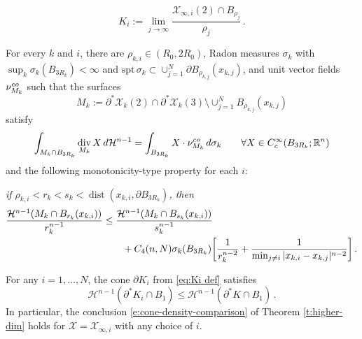 \documentclass[10pt,a4paper]{amsart}
\DeclareMathOperator{\Div}{div}
\DeclareMathOperator{\dist}{dist}
\newcommand{\Hcal}{\mathcal{H}}
\newcommand{\X}{\mathcal{X}}
\newcommand{\spt}{\mathrm{spt}}
\begin{document}
\begin{equation}\label{eq:Ki def}
    K_i := \lim_{j \to \infty} \frac{\X_{\infty,i}(2)\cap B_{\rho_j}}{\rho_j}\,.
\end{equation}

\begin{lemma}\label{l:monotonicity-concentrations}
    For every $k$ and $i$, there are $\rho_{k,i}\in (R_0,2R_0)$, Radon measures $\sigma_{k}$ with $\sup_k \sigma_k(B_{3R_k})<\infty$ and $\spt\, \sigma_{k}\subset \cup_{j=1}^N\partial B_{\rho_{k,j}}(x_{k,j})$, and unit vector fields $\nu_{M_k}^{\rm co}$ such that the surfaces
$$
M_k := \partial^*\X_k(2) \cap \partial^* \X_k(3) \setminus \cup_{j=1}^N B_{\rho_{k,j}}(x_{k,j})
$$
satisfy
\begin{align*}
   \int_{M_k \cap B_{3R_k}}\Div_{M_k}X \,d\mathcal{H}^{n-1} = \int_{B_{3R_k}} X \cdot \nu_{M_k}^{\rm co}\,d\sigma_k \qquad \forall X \in C_c^\infty(B_{3R_k};\mathbb{R}^n) 
\end{align*}
and the following monotonicity-type property for each $i$:
\smallskip

{\it if $\rho_{k,i}<r_k<s_k<\dist(x_{k,i},\partial B_{3R_k})$, then}
\begin{align}\label{eq:large scale area bounds}
    \frac{\mathcal{H}^{n-1}(M_k \cap B_{r_k}(x_{k,i}))}{r_k^{n-1}} &\leq \frac{\mathcal{H}^{n-1}(M_k \cap B_{s_k}(x_{k,i}))}{s_k^{n-1}} \\ \notag
    &\qquad + C_4(n,N)\sigma_k(B_{3R_k})\bigg[\frac{1}{r_k^{n-2}} + \frac{1}{\min_{j\neq i}|x_{k,i}-x_{k,j}|^{n-2}}\bigg]\,.
\end{align}
\end{lemma}

\begin{corollary}\label{c:blowdown-density-bound}
    For any $i=1,\dots, N$, the cone $\partial K_i$ from \eqref{eq:Ki def} satisfies
    \[
        \Hcal^{n-1}(\partial^* K_i \cap B_1) \leq \Hcal^{n-1}(\partial^* K\cap B_1)\,.
    \]
   In particular, the conclusion \eqref{e:cone-density-comparison} of Theorem \ref{t:higher-dim} holds for $\X = \X_{\infty,i}$ with any choice of $i$.
\end{corollary}
\end{document}
